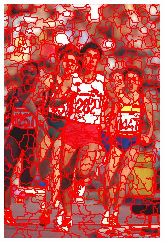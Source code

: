 \begin{figure}
{		\includegraphics[scale=\scalefivebsdtest]{pictures/bsd-test-8-qs}
	}
	\subfigure{
}
\end{figure}
